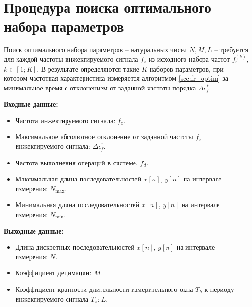 \section{Процедура поиска оптимального набора параметров}

Поиск оптимального набора параметров -- натуральных чисел ${N, M, L}$ -- требуется для каждой частоты инжектируемого сигнала ${f_z}$ из исходного набора частот ${f^{(k)}_z}$, ${k \in \left[1;K \right]}$. В результате определяются такие $K$ наборов параметров, при котором частотная характеристика измеряется алгоритмом \ref{sec:fr_optim} за минимальное время с отклонением от заданной частоты порядка ${\Delta\epsilon^{*}_f}$.

\textbf{Входные данные:}
\begin{itemize}
    \item Частота инжектируемого сигнала: ${f_z}$.
    
    \item Максимальное абсолютное отклонение от заданной частоты ${f_z}$ инжектируемого сигнала: ${\Delta\epsilon^{*}_f}$.
    
    \item Частота выполнения операций в системе: ${f_d}$.
    
    \item Максимальная длина последовательностей ${x[n]}$, ${y[n]}$ на интервале измерения: ${N_\text{max}}$.
    
    \item Минимальная длина последовательностей ${x[n]}$, ${y[n]}$ на интервале измерения: ${N_\text{min}}$.
\end{itemize}

\textbf{Выходные данные:}
\begin{itemize}
    \item Длина дискретных последовательностей ${x[n]}$, ${y[n]}$ на интервале измерения: $N$.
    
    \item Коэффициент децимации: $M$.
    
    \item Коэффициент кратности длительности измерительного окна ${T_h}$ к периоду инжектируемого сигнала ${T_z}$: $L$.
\end{itemize}

